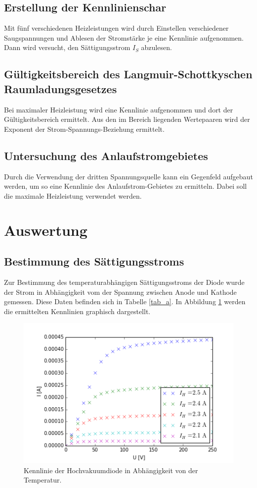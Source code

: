 \documentclass[11pt,ngerman,a4paper]{article}
\begin{document}
\subsection{Erstellung der Kennlinienschar}
Mit fünf verschiedenen Heizleistungen wird durch Einstellen verschiedener Saugspannungen und Ablesen der Stromstärke je eine Kennlinie aufgenommen. Dann wird versucht, den Sättigungsstrom $I_S$ abzulesen.
\subsection{Gültigkeitsbereich des Langmuir-Schottkyschen Raumladungsgesetzes}
Bei maximaler Heizleistung wird eine Kennlinie aufgenommen und dort der Gültigkeitsbereich ermittelt. Aus den im Bereich liegenden Wertepaaren wird der Exponent der Strom-Spannungs-Beziehung ermittelt.
\subsection{Untersuchung des Anlaufstromgebietes}
Durch die Verwendung der dritten Spannungsquelle kann ein Gegenfeld aufgebaut werden, um so eine Kennlinie des Anlaufstrom-Gebietes zu ermitteln. Dabei soll die maximale Heizleistung verwendet werden.
\section{Auswertung}
\subsection{Bestimmung des Sättigungsstroms}
Zur Bestimmung des temperaturabhängigen Sättigungsstroms der Diode wurde der Strom in Abhängigkeit vom der Spannung zwischen Anode und Kathode gemessen. Diese Daten befinden sich in Tabelle \ref{tab_a}. In Abbildung \ref{abb_a} werden die ermittelten Kennlinien graphisch dargestellt. 
\begin{figure}[htp]
\centering
\includegraphics[scale=0.8]{plot_a.png}
\caption{Kennlinie der Hochvakuumdiode in Abhängigkeit von der Temperatur.}
\label{abb_a}
\end{figure}
\end{document}
